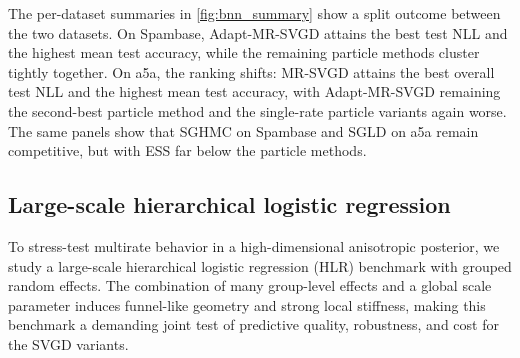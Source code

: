 
The per-dataset summaries in \cref{fig:bnn_summary} show a split outcome
between the two datasets. On Spambase, Adapt-MR-SVGD attains the best test NLL
and the highest mean test accuracy, while the remaining particle methods
cluster tightly together. On a5a, the ranking shifts: MR-SVGD attains the best
overall test NLL and the highest mean test accuracy, with Adapt-MR-SVGD
remaining the second-best particle method and the single-rate particle variants
again worse. The same panels show that SGHMC on Spambase and SGLD on a5a
remain competitive, but with ESS far below the particle methods.

\subsection{Large-scale hierarchical logistic regression}

To stress-test multirate behavior in a high-dimensional anisotropic posterior,
we study a large-scale hierarchical logistic regression (HLR) benchmark with grouped
random effects. The combination of many group-level effects and a global scale
parameter induces funnel-like geometry and strong local stiffness, making this
benchmark a demanding joint test of predictive quality, robustness, and cost
for the SVGD variants.

